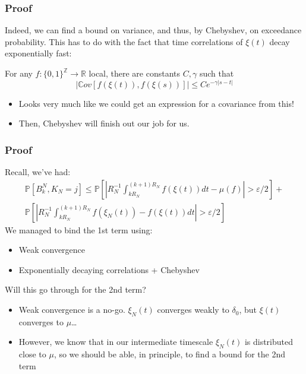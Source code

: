 \documentclass{beamer}
\begin{document}
\begin{frame}
    \frametitle{Proof}
    Indeed, we can find a bound on variance, and thus, by Chebyshev, on exceedance probability. This has to do with the fact that time correlations of $\xi(t)$ decay exponentially fast:
    \begin{theorem}
        For any $f : \{0,1\}^\mathbb{Z}\rightarrow \mathbb{R}$ local, there are constants $C, \gamma$ such that 
        \[
            \left|\mathbb{C}ov\left[ f(\xi(t)), f(\xi(s))\right]\right| \leq Ce^{-\gamma|s-t|}
        \]
    \end{theorem}
    \begin{itemize}
        \item<3-> Looks very much like we could get an expression for a covariance from this! 
        \item<4-> Then, Chebyshev will finish out our job for us.
    \end{itemize}
\end{frame}

\begin{frame}
    \frametitle{Proof}
    Recall, we've had:
    \begin{gather*}
        \mathbb{P}\left[ B^N_k, K_{N} = j \right] \leq \mathbb{P}\left[\left|R_N^{-1}\int_{kR_N}^{(k+1)R_N}f(\xi(t))dt - \mu(f)\right| > \varepsilon/2 \right] + \\
        \mathbb{P}\left[\left|R_N^{-1}\int_{kR_N}^{(k+1)R_N}f(\xi_N(t)) - f(\xi(t))dt \right| > \varepsilon/2\right]
    \end{gather*}
    We managed to bind the 1st term using:
    \begin{itemize}
        \item Weak convergence
        \item Exponentially decaying correlations + Chebyshev
    \end{itemize}

    Will this go through for the 2nd term?
    \begin{itemize}
        \item Weak convergence is a no-go. $\xi_N(t)$ converges weakly to $\delta_0$, but $\xi(t)$ converges to $\mu$\dots
        \item However, we know that in our intermediate timescale $\xi_N(t)$ is distributed close to $\mu$, so we should be able, in principle, to find a bound for the 2nd term 
    \end{itemize}
\end{frame}
\end{document}

